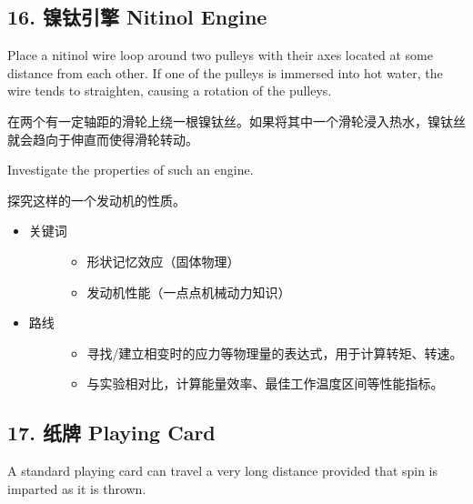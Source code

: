 \documentclass[a4paper,10pt,english]{sphinxmanual}
\begin{document}
\subsection{16. 镍钛引擎 Nitinol Engine}
\label{\detokenize{7. Appendix:nitinol-engine}}
Place a nitinol wire loop around two pulleys with their axes located at some distance from each other. If one of the pulleys is immersed into hot water, the wire tends to straighten, causing a rotation of the pulleys.

在两个有一定轴距的滑轮上绕一根镍钛丝。如果将其中一个滑轮浸入热水，镍钛丝就会趋向于伸直而使得滑轮转动。

Investigate the properties of such an engine.

探究这样的一个发动机的性质。
\begin{itemize}
\item {} \begin{description}
\item[{关键词}] \leavevmode\begin{itemize}
\item {} 
形状记忆效应（固体物理）

\item {} 
发动机性能（一点点机械动力知识）

\end{itemize}

\end{description}

\item {} \begin{description}
\item[{路线}] \leavevmode\begin{itemize}
\item {} 
寻找/建立相变时的应力等物理量的表达式，用于计算转矩、转速。

\item {} 
与实验相对比，计算能量效率、最佳工作温度区间等性能指标。

\end{itemize}

\end{description}

\end{itemize}


\subsection{17. 纸牌 Playing Card}
\label{\detokenize{7. Appendix:playing-card}}
A standard playing card can travel a very long distance provided that spin is imparted as it is thrown.
\end{document}

